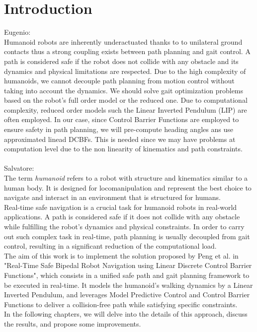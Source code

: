 \documentclass[main.tex]{subfiles}
\begin{document}
\section{Introduction}\label{sec:introduction}
Eugenio:\\
Humanoid robots are inherently underactuated thanks to to unilateral ground contacts thus a strong coupling exists between path planning and gait control. A path is considered safe if the robot does not collide with any obstacle and its dynamics and physical limitations are respected.
Due to the high complexity of humanoids, we cannot decouple path planning from motion control without taking into account the dynamics. We should solve gait optimization problems based on the robot's full order model or the reduced one. Due to computational complexity, reduced order models such the Linear Inverted Pendulum (LIP) are often employed. In our case, since Control Barrier Functions are employed to ensure safety in path planning, we will pre-compute heading angles ans use approximated linead DCBFs.
This is needed since we may have problems at computation level due to the non linearity of kinematics and path constraints.
\\\\
Salvatore:\\
The term \textit{humanoid} refers to a robot with structure and kinematics similar to a human body. It is designed for locomanipulation and represent the best choice to navigate and interact in an environment that is structured for humans.
\\Real-time safe navigation is a crucial task for humanoid robots in real-world applications. A path is considered safe if it does not collide with any obstacle while fulfilling the robot's dynamics and physical constraints. In order to carry out such complex task in real-time, path planning is usually decoupled from gait control, resulting in a significant reduction of the computational load.
\\The aim of this work is to implement the solution proposed by Peng et al. in "Real-Time Safe Bipedal Robot Navigation using Linear Discrete Control Barrier Functions", which consists in a unified safe path and gait planning framework to be executed in real-time. It models the humanoid's walking dynamics by a Linear Inverted Pendulum, and leverages Model Predictive Control and Control Barrier Functions to deliver a collision-free path while satisfying specific constraints.
\\In the following chapters, we will delve into the details of this approach, discuss the results, and propose some improvements.
\end{document}
